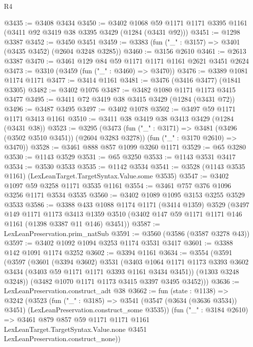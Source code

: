 \begin{lexlean}{R4}
\begin{coremodule}
@3435 := @3408 @3434
@3450 := @3402
    @1068
    @59
    @1171
    @1171
    @3395
    @1161
    (@3411 @92 @3419 @38 @3395 @3429 (@1284 (@3431 @92)))
@3451 := @1298 @3387
@3452 := @3450 @3451
@3459 := @3383 (fun ("_" : @3157) => @3401 (@3435 @3452) (@2604 @3248 @3285))
@3460 := @3156 @2610
@3461 := @2613 @3387
@3470 := @3461 @129 @84 @59 @1171 @1171 @1161 @2621 @3451 @2624
@3473 := @3310 (@3459 (fun ("_" : @3460) => @3470))
@3476 := @3389 @1081 @1174 @1171
@3477 := @3414 @1161
@3481 := @3476 (@3416 @3477) (@1841 @3305)
@3482 := @3402 @1076
@3487 := @3482 @1080 @1171 @1173 @3415 @3477
@3495 := @3411 @72 @3419 @38 @3415 @3429 (@1284 (@3431 @72))
@3496 := @3487 @3495
@3497 := @3402 @1078
@3502 := @3497 @59 @1171 @1171 @3413 @1161
@3510 := @3411 @38 @3419 @38 @3413 @3429 (@1284 (@3431 @38))
@3523 := @3295
    (@3473
      (fun ("_" : @3171) => @3481 (@3496 (@3502 @3510 @3451)) (@2604 @3283 @3278))
      (fun ("_" : @3170 @2610) => @3470))
@3528 := @3461 @888 @857 @1099 @3260 @1171
@3529 := @65 @3280
@3530 := @1143 @3529
@3531 := @65 @3250
@3533 := @1143 @3531 @3417
@3534 := @3530 @3533
@3535 := @1142 @3534
@3541 := @3528 (@1143 @3535 @1161) (LexLeanTarget.TargetSyntax.Value.some @3535)
@3547 := @3402 @1097 @59 @3258 @1171 @3535 @1161
@3554 := @3461 @757 @376 @1096 @3256 @1171 @3534 @3535
@3560 := @3402 @1089 @1095 @3153 @3255 @3529 @3533
@3586 := @3388
    @433
    @1088
    @1174
    @1171
    (@3414 @1359)
    @3529
    (@3497
      @149
      @1171
      @1173
      @3413
      @1359
      @3510
      (@3402 @147 @59 @1171 @1171 @146 @1161 (@1398 @3387 @11 @146) @3451))
@3587 := LexLeanPreservation.prim_natSub
@3591 := @3560 (@3586 (@3587 @3278 @43))
@3597 := @3402 @1092 @1094 @3253 @1174 @3531 @3417
@3601 := @3388 @142 @1091 @1174 @3252
@3602 := @3394 @1161
@3634 := @3554
    (@3591
      (@3597
        (@3601
          (@3394 @3602)
          @3531
          (@3403
            @1064
            @1171
            @1173
            @3393
            @3602
            @3434
            (@3403 @59 @1171 @1171 @3393 @1161 @3434 @3451))
          (@1303 @3248 @3248))
        (@3482 @1070 @1171 @1173 @3415 @3397 @3495 @3452)))
@3636 := LexLeanPreservation.construct_adt @38
@3662 := fun (state : @1138) =>
  @3242
    (@3523
      (fun ("_" : @3185) =>
      @3541 (@3547 (@3634 (@3636 @3534)) @3451) (LexLeanPreservation.construct_some @3535))
      (fun ("_" : @3184 @2610) =>
      @3461
        @879
        @857
        @59
        @1171
        @1171
        @1161
        LexLeanTarget.TargetSyntax.Value.none
        @3451
        LexLeanPreservation.construct_none))

\end{coremodule}
\end{lexlean}
